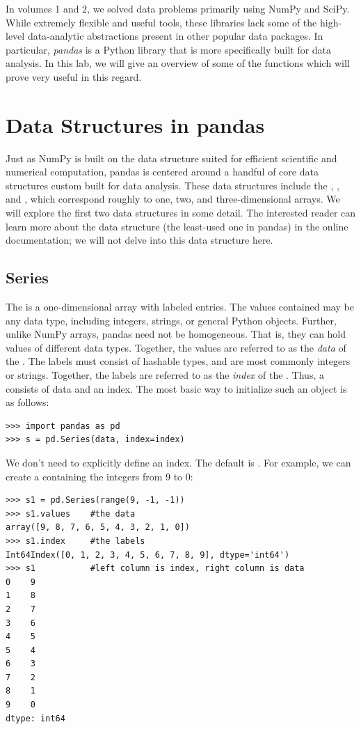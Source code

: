 \label{lab:pandas1}

In volumes 1 and 2, we solved data problems primarily using NumPy and SciPy.
While extremely flexible and useful tools, these libraries lack some of the high-level 
data-analytic abstractions present in other popular data packages.
In particular, \emph{pandas} is a Python library that is more specifically built for data analysis.  In this lab, we will give an overview of some of the functions which will prove very useful in this regard.

\section*{Data Structures in pandas}
Just as NumPy is built on the  data structure suited for efficient scientific
and numerical computation, pandas is centered around a handful of core data structures
custom built for data analysis. These data structures include the , ,
and , which correspond roughly to one, two, and three-dimensional arrays.
We will explore the first two data structures in some detail.
The interested reader can learn more about the  data structure (the least-used one in pandas) in the online documentation; we will not delve into this data structure here.

\subsection*{Series}
The  is a one-dimensional array with labeled entries. The values contained may be any data type, including integers, strings, or general Python objects. Further, unlike NumPy arrays, pandas  need not be homogeneous. That is, they can hold values of different data types. Together,
the values are referred to as the \emph{data} of the .
The labels must consist of hashable types, and are most commonly integers or strings.
Together, the labels are referred to as the \emph{index} of the .
Thus, a  consists of data and an index. The most basic way to initialize such an object
is as follows:
\begin{lstlisting}
>>> import pandas as pd
>>> s = pd.Series(data, index=index)
\end{lstlisting}
We don't need to explicitly define an index. The default is .
For example, we can create a  containing the integers from 9 to 0:
\begin{lstlisting}
>>> s1 = pd.Series(range(9, -1, -1))
>>> s1.values    #the data
array([9, 8, 7, 6, 5, 4, 3, 2, 1, 0])
>>> s1.index     #the labels
Int64Index([0, 1, 2, 3, 4, 5, 6, 7, 8, 9], dtype='int64')
>>> s1           #left column is index, right column is data
0    9
1    8
2    7
3    6
4    5
5    4
6    3
7    2
8    1
9    0
dtype: int64
\end{lstlisting}

